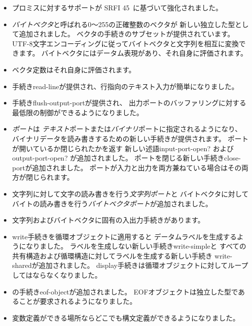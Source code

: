 \begin{itemize}
\item プロミスに対するサポートが
SRFI 45~\cite{srfi45}に基づいて強化されました。

\item {\em バイトベクタ}と呼ばれる0〜255の正確整数のベクタが
新しい独立した型として追加されました。
ベクタの手続きのサブセットが提供されています。
UTF-8文字エンコーディングに従ってバイトベクタと文字列を相互に変換できます。
バイトベクタにはデータム表現があり、それ自身に評価されます。

\item ベクタ定数はそれ自身に評価されます。

\item 手続き{\cf read-line}が提供され、行指向のテキスト入力が簡単になりました。

\item 手続き{\cf flush-output-port}が提供され、
出力ポートのバッファリングに対する最低限の制御ができるようになりました。

\item {\em ポート}は
{\em テキスト}ポートまたは{\em バイナリ}ポートに指定されるようになり、
バイナリデータを読み書きするための新しい手続きが提供されます。
ポートが開いているか閉じられたかを返す
新しい述語{\cf input-port-open?} および{\cf output-port-open?} が追加されました。
ポートを閉じる新しい手続き{\cf close-port}が追加されました。
ポートが入力と出力を両方兼ねている場合はその両方が閉じられます。

\item 文字列に対して文字の読み書きを行う{\em 文字列ポート}と
バイトベクタに対してバイトの読み書きを行う{\em バイトベクタポート}が追加されました。

\item 文字列およびバイトベクタに固有の入出力手続きがあります。

\item {\cf write}手続きを循環オブジェクトに適用すると
データムラベルを生成するようになりました。
ラベルを生成しない新しい手続き{\cf write-simple}と
すべての共有構造および循環構造に対してラベルを生成する新しい手続き
{\cf write-shared}が追加されました。
{\cf display}手続きは循環オブジェクトに対してループしてはならなくなりました。

\item \rsixrs{}の手続き{\cf eof-object}が追加されました。
EOFオブジェクトは独立した型であることが要求されるようになりました。

\item 変数定義ができる場所ならどこでも構文定義ができるようになりました。


\end{itemize}
